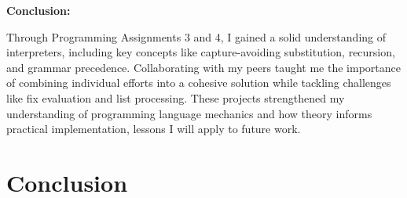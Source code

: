 \documentclass{article}
\theoremstyle{theorem}
\theoremstyle{definition}
\theoremstyle{remark}
\begin{document}
\textbf{Conclusion:}

Through Programming Assignments 3 and 4, I gained a solid understanding of interpreters, including 
key concepts like capture-avoiding substitution, recursion, and grammar precedence. Collaborating 
with my peers taught me the importance of combining individual efforts into a cohesive solution 
while tackling challenges like fix evaluation and list processing. These projects strengthened 
my understanding of programming language mechanics and how theory informs practical implementation, 
lessons I will apply to future work.

\section{Conclusion}\label{conclusion}
\end{document}
